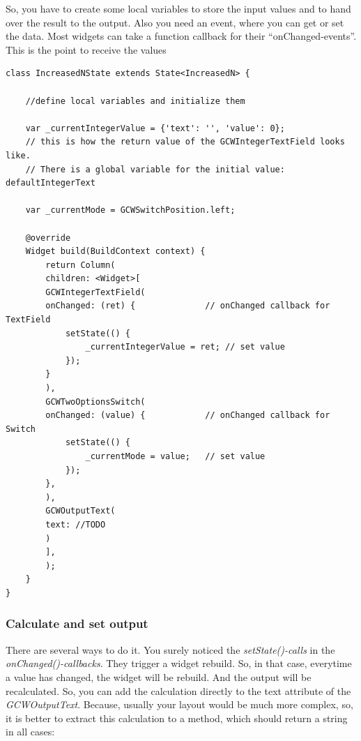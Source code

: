 So, you have to create some local variables to store the input values and to hand over the result to the output. Also you need an event, where you can get or set the data. Most widgets can take a function callback for their \enquote{onChanged-events}. This is the point to receive the values

\begin{lstlisting}
class IncreasedNState extends State<IncreasedN> {
    
    //define local variables and initialize them
    
    var _currentIntegerValue = {'text': '', 'value': 0}; 
    // this is how the return value of the GCWIntegerTextField looks like. 
    // There is a global variable for the initial value: defaultIntegerText
    
    var _currentMode = GCWSwitchPosition.left;
    
    @override
    Widget build(BuildContext context) {
        return Column(
        children: <Widget>[
        GCWIntegerTextField(
        onChanged: (ret) {              // onChanged callback for TextField
            setState(() {
                _currentIntegerValue = ret; // set value
            });
        }
        ),
        GCWTwoOptionsSwitch(
        onChanged: (value) {            // onChanged callback for Switch
            setState(() {
                _currentMode = value;   // set value
            });
        },
        ),
        GCWOutputText(
        text: //TODO
        )
        ],
        );
    }
}
\end{lstlisting}
\label{fig: widgetinput}

\subsubsection{Calculate and set output}
There are several ways to do it. You surely noticed the \emph{setState()-calls} in the \emph{onChanged()-callbacks}. They trigger a widget rebuild. So, in that case, everytime a value has changed, the widget will be rebuild. And the output will be recalculated. So, you can add the calculation directly to the text attribute of the \emph{GCWOutputText}. Because, usually your layout would be much more complex, so, it is better to extract this calculation to a method, which should return a string in all cases:

